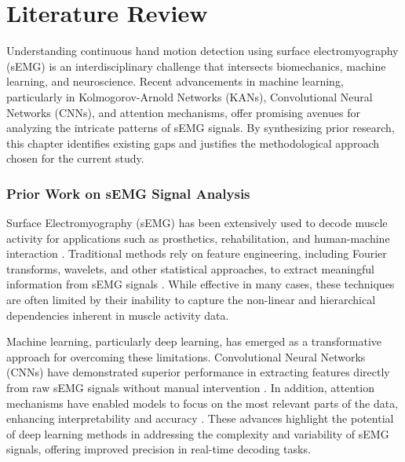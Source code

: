 \chapter{Literature Review}
\label{chap:lr}

Understanding continuous hand motion detection using surface electromyography (sEMG) is an interdisciplinary challenge that intersects biomechanics, machine learning, and neuroscience. Recent advancements in machine learning, particularly in Kolmogorov-Arnold Networks (KANs), Convolutional Neural Networks (CNNs), and attention mechanisms, offer promising avenues for analyzing the intricate patterns of sEMG signals. By synthesizing prior research, this chapter identifies existing gaps and justifies the methodological approach chosen for the current study.

\subsection{Prior Work on sEMG Signal Analysis}
Surface Electromyography (sEMG) has been extensively used to decode muscle activity for applications such as prosthetics, rehabilitation, and human-machine interaction \cite{farago2022review,simao2019review,zheng2022surface}. Traditional methods rely on feature engineering, including Fourier transforms, wavelets, and other statistical approaches, to extract meaningful information from sEMG signals \cite{oladazimi2012review}. While effective in many cases, these techniques are often limited by their inability to capture the non-linear and hierarchical dependencies inherent in muscle activity data.

Machine learning, particularly deep learning, has emerged as a transformative approach for overcoming these limitations. Convolutional Neural Networks (CNNs) have demonstrated superior performance in extracting features directly from raw sEMG signals without manual intervention \cite{ameri2019regression,briouza2021convolutional}. In addition, attention mechanisms have enabled models to focus on the most relevant parts of the data, enhancing interpretability and accuracy \cite{zhang2023lstm,lee2022explainable}. These advances highlight the potential of deep learning methods in addressing the complexity and variability of sEMG signals, offering improved precision in real-time decoding tasks.


